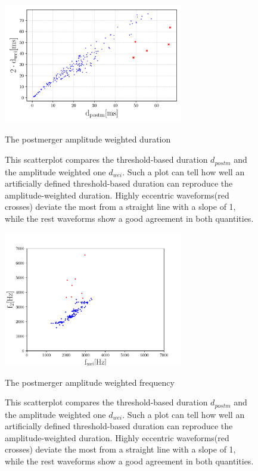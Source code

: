 \begin{figure}[hbt!]
\begin{center}
\includegraphics[width=0.7\textwidth, angle=0]{images/Data_analysis/results/res1.pdf}
\captionsetup{width=0.8\textwidth}
\caption{The postmerger amplitude weighted duration}
\caption*{This scatterplot compares the threshold-based duration $d_{postm}$ and the amplitude weighted one $d_{wei}$. Such a plot can tell how well an artificially defined threshold-based duration can reproduce the amplitude-weighted duration. Highly eccentric waveforms(red crosses) deviate the most from a straight line with a slope of 1, while the rest waveforms show a good agreement in both quantities.}
\label{duration measure}
\end{center}
\end{figure}


\begin{figure}[hbt!]
\begin{center}
\includegraphics[width=0.7\textwidth, angle=0]{images/Data_analysis/results/f2.pdf}
\captionsetup{width=0.8\textwidth}
\caption{The postmerger amplitude weighted frequency}
\caption*{This scatterplot compares the threshold-based duration $d_{postm}$ and the amplitude weighted one $d_{wei}$. Such a plot can tell how well an artificially defined threshold-based duration can reproduce the amplitude-weighted duration. Highly eccentric waveforms(red crosses) deviate the most from a straight line with a slope of 1, while the rest waveforms show a good agreement in both quantities.}
\label{duration measure}
\end{center}
\end{figure}

\FloatBarrier








